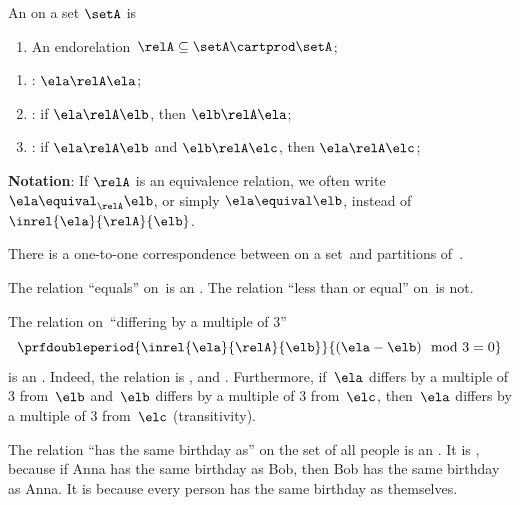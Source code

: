 \begin{ctdefinition}
    \label{def:equivalence-relation}
    An  on a set $\setA$ is

    \constit
    \begin{enumerate}
        \item An endorelation~$\relA\subseteq \setA \cartprod \setA$;
    \end{enumerate}
    \condit
    \begin{enumerate}
        \item  {}: $\ela \relA \ela$;
        \item {}: if $\ela \relA \elb$, then $\elb \relA \ela$;
        \item {}: if $\ela \relA \elb$ and $\elb \relA \elc$, then $\ela \relA \elc$;
    \end{enumerate}

    \textbf{Notation}: If $\relA$ is an equivalence relation, we often write~$\ela\equival_\relA \elb$, or simply $\ela\equival \elb$, instead of~$\inrel{\ela}{\relA}{\elb}$.
\end{ctdefinition}

\begin{lemma}
    There is a one-to-one correspondence between  on a set~\setA and partitions of~\setA.
\end{lemma}

\begin{example}
    The relation ``equals'' on~\natnumbers is an .
    The relation ``less than or equal'' on~\natnumbers is not.
\end{example}

\begin{example}
    The relation on~\natnumbers ``differing by a multiple of 3''
    \begin{equation}
        \prfdoubleperiod{
            \inrel{\ela}{\relA}{\elb}
        }{
            (\ela-\elb) \mod 3 = 0
        }
    \end{equation}
    is an .
    Indeed, the relation is , and .
    Furthermore, if~$\ela$ differs by a multiple of 3 from~$\elb$ and~$\elb$ differs by a multiple of 3 from~$\elc$, then~$\ela$ differs by a multiple of 3 from~$\elc$ (transitivity).
\end{example}

\begin{example}
    The relation ``has the same birthday as'' on the set of all people is an .
    It is , because if Anna has the same birthday as Bob, then Bob has the same birthday as Anna.
    It is  because every person has the same birthday as themselves.
\end{example}

